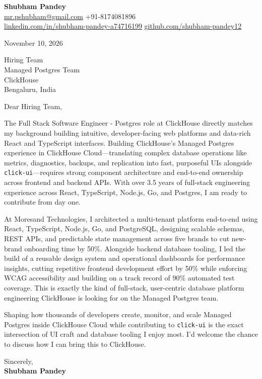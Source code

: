 \documentclass[a4paper,11pt]{article}
\begin{document}
\textbf{\Large Shubham Pandey}\\
\href{mailto:mr.pshubham@gmail.com}{mr.pshubham@gmail.com} \quad +91-8174081896\\
\href{https://www.linkedin.com/in/shubham-pandey-a74716199/}{linkedin.com/in/shubham-pandey-a74716199} \quad
\href{https://github.com/shubham-pandey12}{github.com/shubham-pandey12}

\vspace{1em}
November 10, 2026

\vspace{1em}
Hiring Team\\
Managed Postgres Team\\
ClickHouse\\
Bengaluru, India

\vspace{1em}
Dear Hiring Team,

The Full Stack Software Engineer - Postgres role at ClickHouse directly matches my background building intuitive, developer-facing web platforms and data-rich React and TypeScript interfaces. Building ClickHouse's Managed Postgres experience in ClickHouse Cloud---translating complex database operations like metrics, diagnostics, backups, and replication into fast, purposeful UIs alongside \texttt{click-ui}---requires strong component architecture and end-to-end ownership across frontend and backend APIs. With over 3.5 years of full-stack engineering experience across React, TypeScript, Node.js, Go, and Postgres, I am ready to contribute from day one.

At Moresand Technologies, I architected a multi-tenant platform end-to-end using React, TypeScript, Node.js, Go, and PostgreSQL, designing scalable schemas, REST APIs, and predictable state management across five brands to cut new-brand onboarding time by 50\%. Alongside backend database tooling, I led the build of a reusable design system and operational dashboards for performance insights, cutting repetitive frontend development effort by 50\% while enforcing WCAG accessibility and building on a track record of 90\% automated test coverage. This is exactly the kind of full-stack, user-centric database platform engineering ClickHouse is looking for on the Managed Postgres team.

Shaping how thousands of developers create, monitor, and scale Managed Postgres inside ClickHouse Cloud while contributing to \texttt{click-ui} is the exact intersection of UI craft and database tooling I enjoy most. I'd welcome the chance to discuss how I can bring this to ClickHouse.

\vspace{1em}
Sincerely,\\[0.5em]
\textbf{Shubham Pandey}
\end{document}

